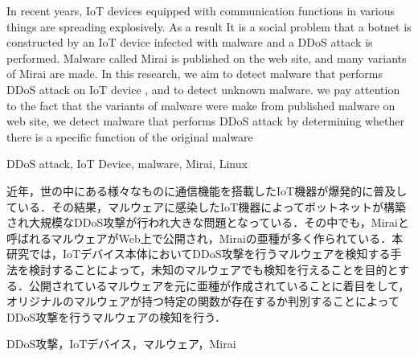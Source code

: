 \maketitle    %
\begin{eabstract}
{In recent years, IoT devices equipped with communication functions in various things are spreading explosively. As a result It is a social problem that a botnet is constructed by an IoT device infected with malware and a DDoS attack is performed. Malware called Mirai is published on the web site, and many variants of Mirai are made. In this research, we aim to detect malware that performs DDoS attack on IoT device , and to detect unknown malware. we pay attention to the fact that the variants of malware were make from published malware on web site, we detect malware that performs DDoS attack by determining whether there is a specific function of the original malware}
\end{eabstract}

\begin{ekeyword}
DDoS attack, IoT Device, malware, Mirai, Linux
\end{ekeyword}

\begin{jabstract}
近年，世の中にある様々なものに通信機能を搭載したIoT機器が爆発的に普及している．その結果，マルウェアに感染したIoT機器によってボットネットが構築され大規模なDDoS攻撃が行われ大きな問題となっている．その中でも，Miraiと呼ばれるマルウェアがWeb上で公開され，Miraiの亜種が多く作られている．本研究では，IoTデバイス本体においてDDoS攻撃を行うマルウェアを検知する手法を検討することによって，未知のマルウェアでも検知を行えることを目的とする．公開されているマルウェアを元に亜種が作成されていることに着目をして，オリジナルのマルウェアが持つ特定の関数が存在するか判別することによってDDoS攻撃を行うマルウェアの検知を行う．
\end{jabstract}

\begin{jkeyword}
DDoS攻撃，IoTデバイス，マルウェア，Mirai
\end{jkeyword}
\tableofcontents %
